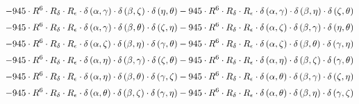 \begin{subequations}
\begin{gather}
 \\[0.2em] \notag 		 - 945 \cdot R^{6} \cdot R_{\delta{}} \cdot R_{\epsilon{}} \cdot \delta{}\left(\alpha{}, \gamma{}\right) \cdot \delta{}\left(\beta{}, \zeta{}\right) \cdot \delta{}\left(\eta{}, \theta{}\right)- 945 \cdot R^{6} \cdot R_{\delta{}} \cdot R_{\epsilon{}} \cdot \delta{}\left(\alpha{}, \gamma{}\right) \cdot \delta{}\left(\beta{}, \eta{}\right) \cdot \delta{}\left(\zeta{}, \theta{}\right) 
 \\[0.2em] \notag 		 - 945 \cdot R^{6} \cdot R_{\delta{}} \cdot R_{\epsilon{}} \cdot \delta{}\left(\alpha{}, \gamma{}\right) \cdot \delta{}\left(\beta{}, \theta{}\right) \cdot \delta{}\left(\zeta{}, \eta{}\right)- 945 \cdot R^{6} \cdot R_{\delta{}} \cdot R_{\epsilon{}} \cdot \delta{}\left(\alpha{}, \zeta{}\right) \cdot \delta{}\left(\beta{}, \gamma{}\right) \cdot \delta{}\left(\eta{}, \theta{}\right) 
 \\[0.2em] \notag 		 - 945 \cdot R^{6} \cdot R_{\delta{}} \cdot R_{\epsilon{}} \cdot \delta{}\left(\alpha{}, \zeta{}\right) \cdot \delta{}\left(\beta{}, \eta{}\right) \cdot \delta{}\left(\gamma{}, \theta{}\right)- 945 \cdot R^{6} \cdot R_{\delta{}} \cdot R_{\epsilon{}} \cdot \delta{}\left(\alpha{}, \zeta{}\right) \cdot \delta{}\left(\beta{}, \theta{}\right) \cdot \delta{}\left(\gamma{}, \eta{}\right) 
 \\[0.2em] \notag 		 - 945 \cdot R^{6} \cdot R_{\delta{}} \cdot R_{\epsilon{}} \cdot \delta{}\left(\alpha{}, \eta{}\right) \cdot \delta{}\left(\beta{}, \gamma{}\right) \cdot \delta{}\left(\zeta{}, \theta{}\right)- 945 \cdot R^{6} \cdot R_{\delta{}} \cdot R_{\epsilon{}} \cdot \delta{}\left(\alpha{}, \eta{}\right) \cdot \delta{}\left(\beta{}, \zeta{}\right) \cdot \delta{}\left(\gamma{}, \theta{}\right) 
 \\[0.2em] \notag 		 - 945 \cdot R^{6} \cdot R_{\delta{}} \cdot R_{\epsilon{}} \cdot \delta{}\left(\alpha{}, \eta{}\right) \cdot \delta{}\left(\beta{}, \theta{}\right) \cdot \delta{}\left(\gamma{}, \zeta{}\right)- 945 \cdot R^{6} \cdot R_{\delta{}} \cdot R_{\epsilon{}} \cdot \delta{}\left(\alpha{}, \theta{}\right) \cdot \delta{}\left(\beta{}, \gamma{}\right) \cdot \delta{}\left(\zeta{}, \eta{}\right) 
 \\[0.2em] \notag 		 - 945 \cdot R^{6} \cdot R_{\delta{}} \cdot R_{\epsilon{}} \cdot \delta{}\left(\alpha{}, \theta{}\right) \cdot \delta{}\left(\beta{}, \zeta{}\right) \cdot \delta{}\left(\gamma{}, \eta{}\right)- 945 \cdot R^{6} \cdot R_{\delta{}} \cdot R_{\epsilon{}} \cdot \delta{}\left(\alpha{}, \theta{}\right) \cdot \delta{}\left(\beta{}, \eta{}\right) \cdot \delta{}\left(\gamma{}, \zeta{}\right) 

\end{gather}
\end{subequations}
